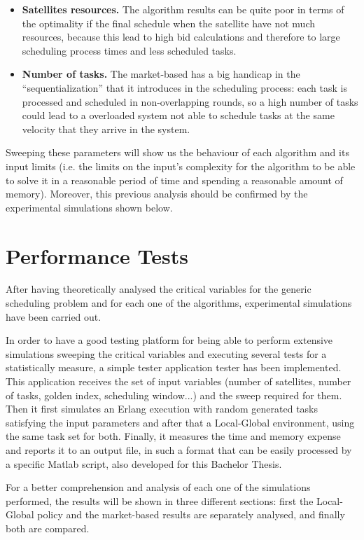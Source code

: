\begin{itemize}
\item \textbf{Satellites resources. } The algorithm results can be quite poor in terms of the optimality if the final schedule when the satellite have not much resources, because this lead to high bid calculations and therefore to large scheduling process times and less scheduled tasks.

\item \textbf{Number of tasks. } The market-based has a big handicap in the ``sequentialization'' that it introduces in the scheduling process: each task is processed and scheduled in non-overlapping rounds, so a high number of tasks could lead to a overloaded system not able to schedule tasks at the same velocity that they arrive in the system.
\end{itemize}

Sweeping these parameters will show us the behaviour of each algorithm and its input limits (i.e. the limits on the input's complexity for the algorithm to be able to solve it in a reasonable period of time and spending a reasonable amount of memory). Moreover, this previous analysis should be confirmed by the experimental simulations shown below.

\section{Performance Tests}

After having theoretically analysed the critical variables for the generic scheduling problem and for each one of the algorithms, experimental simulations have been carried out.

In order to have a good testing platform for being able to perform extensive simulations sweeping the critical variables and executing several tests for a statistically measure, a simple tester application tester has been implemented. This application receives the set of input variables (number of satellites, number of tasks, golden index, scheduling window...) and the sweep required for them. Then it first simulates an Erlang execution with random generated tasks satisfying the input parameters and after that a Local-Global environment, using the same task set for both. Finally, it measures the time and memory expense and reports it to an output file, in such a format that can be easily processed by a specific Matlab script, also developed for this Bachelor Thesis.

For a better comprehension and analysis of each one of the simulations performed, the results will be shown in three different sections: first the Local-Global policy and the market-based results are separately analysed, and finally both are compared.

